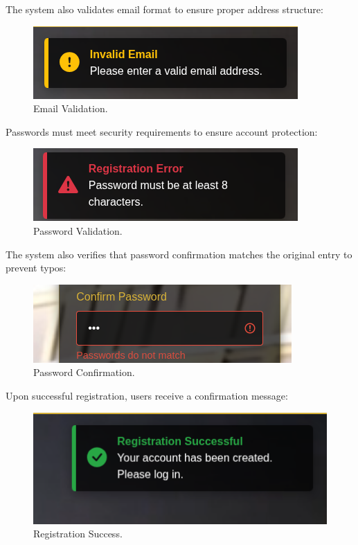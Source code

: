 The system also validates email format to ensure proper address structure:

\begin{figure}[H]
    \centering
    \includegraphics[width=0.6\linewidth]{Figures/images/new_images/ErrorEmail.png}
    \caption{Email Validation.} %
    \label{fig:error-email-wireframe}
\end{figure}

Passwords must meet security requirements to ensure account protection:

\begin{figure}[H]
    \centering
    \includegraphics[width=0.6\linewidth]{Figures/images/new_images/ErrorPassword.png}
    \caption{Password Validation.} %
    \label{fig:error-password-wireframe}
\end{figure}

The system also verifies that password confirmation matches the original entry to prevent typos:

\begin{figure}[H]
    \centering
    \includegraphics[width=0.6\linewidth]{Figures/images/new_images/ErrorConfirmPassword.png}
    \caption{Password Confirmation.} %
    \label{fig:error-confirm-password-wireframe}
\end{figure}

Upon successful registration, users receive a confirmation message:

\begin{figure}[H]
    \centering
    \includegraphics[width=0.6\linewidth]{Figures/images/new_images/RegistrationSuccess.png}
    \caption{Registration Success.} %
    \label{fig:registration-success-wireframe}
\end{figure}

